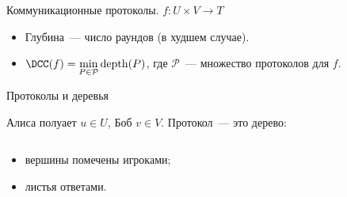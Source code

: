 \begin{frame}{Коммуникационные протоколы. $f\colon U \times V \to T$}
    \begin{center}
    	    
    \end{center}

    \pause
    \pause
    \pause
	\pause

    \begin{itemize}
        \item Глубина~--- число раундов (в худшем случае).
        \item $\DCC(f) = \min\limits_{P \in \mathcal{P}} \mathrm{depth}(P)$, где $\mathcal{P}$~---
            множество протоколов для $f$.
    \end{itemize}
\end{frame}

\begin{frame}{Протоколы и деревья}

    Алиса полуает $u \in U$, Боб $v \in V$. Протокол~--- это дерево:

    \begin{columns}[t]
		\begin{column}{0.7\textwidth}
            \begin{itemize}
                \item<2-> вершины помечены игроками;
    		    \item<7-> листья ответами.
	        \end{itemize}

        \end{column}
        
		\begin{column}{0.25\textwidth}
            
		\end{column}
	\end{columns}

\end{frame}

